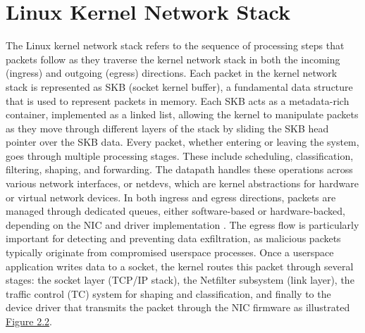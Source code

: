 \documentclass [11pt, proquest] {uwthesis}[2020/02/24]
\begin{document}
\section{Linux Kernel Network Stack}
The Linux kernel network stack refers to the sequence of processing steps that packets follow as they traverse the kernel network stack in both the incoming (ingress) and outgoing (egress) directions. Each packet in the kernel network stack is represented as SKB (socket kernel buffer), a fundamental data structure that is used to represent packets in memory. Each SKB acts as a metadata-rich container, implemented as a linked list, allowing the kernel to manipulate packets as they move through different layers of the stack by sliding the SKB head pointer over the SKB data. Every packet, whether entering or leaving the system, goes through multiple processing stages. These include scheduling, classification, filtering, shaping, and forwarding. The datapath handles these operations across various network interfaces, or netdevs, which are kernel abstractions for hardware or virtual network devices. In both ingress and egress directions, packets are managed through dedicated queues, either software-based or hardware-backed, depending on the NIC and driver implementation \cite{stephan2024path}. The egress flow is particularly important for detecting and preventing data exfiltration, as malicious packets typically originate from compromised userspace processes. Once a userspace application writes data to a socket, the kernel routes this packet through several stages: the socket layer (TCP/IP stack), the Netfilter subsystem (link layer), the traffic control (TC) system for shaping and classification, and finally to the device driver that transmits the packet through the NIC firmware as illustrated \hyperref[sec:kernel-network-datapath]{Figure 2.2}.

\end{document}
